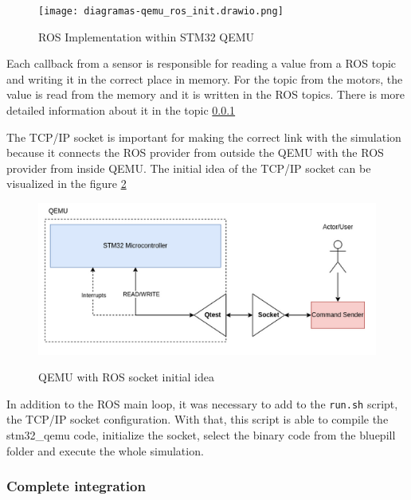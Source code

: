 \documentclass[../../monografia.tex]{subfiles}
\begin{document}
\begin{figure}[h!]
    \caption{ROS Implementation within STM32 QEMU}
    \centering
    \texttt{[image: diagramas-qemu\_ros\_init.drawio.png]}
    \label{fig: ROS Implementation within STM32 QEMU}
\end{figure}

Each callback from a sensor is responsible for reading a value from a ROS topic and writing it in the correct place in memory. For the topic from the motors, the value is read from the memory and it is written in the ROS topics. There is more  detailed information about it in the topic \ref{subsubsection: Complete integration}

The TCP/IP socket is important for making the correct link with the simulation because it connects the ROS provider from outside the QEMU with the ROS provider from inside QEMU. The initial idea of the TCP/IP socket can be visualized in the figure \ref{fig: QEMU with ROS socket initial idea}

\begin{figure}[h!]
    \caption{QEMU with ROS socket initial idea}
    \centering
    \includegraphics[width=16cm]{src/images/ros_socket.png}
    \label{fig: QEMU with ROS socket initial idea}
\end{figure}

In addition to the ROS main loop, it was necessary to add to the \texttt{run.sh} script, the TCP/IP socket configuration. With that, this script is able to compile the stm32\_qemu code, initialize the socket, select the binary code from the bluepill folder and execute the whole simulation.

\subsubsection{Complete integration}
\label{subsubsection: Complete integration}
\end{document}

